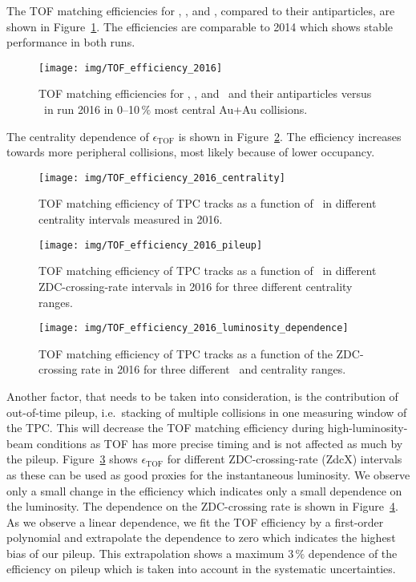 The TOF matching efficiencies for \piplus, \Kplus, and \pplus, compared to their antiparticles, are shown in Figure~\ref{tof2016}. The efficiencies are comparable to 2014 which shows stable performance in both runs.

\begin{figure}[!htb]
\centering
\texttt{[image: img/TOF\_efficiency\_2016]}
\caption{\label{tof2016} TOF matching efficiencies for \piplus, \Kplus, and \pplus\ and their antiparticles versus \pt\ in run 2016 in 0--10$\,\%$ most central Au+Au collisions.}
\end{figure}

The centrality dependence of $\epsilon_\mathrm{TOF}$ is shown in Figure~\ref{tof2016centrality}\@. The efficiency increases towards more peripheral collisions, most likely because of lower occupancy. 

\begin{figure}[!htb]
\centering
\texttt{[image: img/TOF\_efficiency\_2016\_centrality]}
\caption{\label{tof2016centrality} TOF matching efficiency of TPC tracks as a function of \pt\ in different centrality intervals measured in 2016\@.}
\end{figure}

\begin{figure}[!htb]
\centering
\texttt{[image: img/TOF\_efficiency\_2016\_pileup]}
\caption{\label{tof2016pileup} TOF matching efficiency of TPC tracks as a function of \pt\ in different ZDC-crossing-rate intervals in 2016 for three different centrality ranges.}
\end{figure}

\begin{figure}[!htb]
\centering
\texttt{[image: img/TOF\_efficiency\_2016\_luminosity\_dependence]}
\caption{\label{tof2016lumiDependence} TOF matching efficiency of TPC tracks as a function of the ZDC-crossing rate in 2016 for three different \pt\ and centrality ranges.}
\end{figure}

Another factor, that needs to be taken into consideration, is the contribution of out-of-time pileup, i.e.\ stacking of multiple collisions in one measuring window of the TPC\@. This will decrease the TOF matching efficiency during high-luminosity-beam conditions as TOF has more precise timing and is not affected as much by the pileup. Figure~\ref{tof2016pileup} shows $\epsilon_\mathrm{TOF}$ for different ZDC-crossing-rate (ZdcX) intervals as these can be used as good proxies for the instantaneous luminosity. We observe only a small change in the efficiency which indicates only a small dependence on the luminosity. The dependence on the ZDC-crossing rate is shown in Figure~\ref{tof2016lumiDependence}. As we observe a linear dependence, we fit the TOF efficiency by a first-order polynomial and extrapolate the dependence to zero which indicates the highest bias of our pileup. This extrapolation shows a maximum $3\,\%$ dependence of the efficiency on pileup which is taken into account in the systematic uncertainties.

